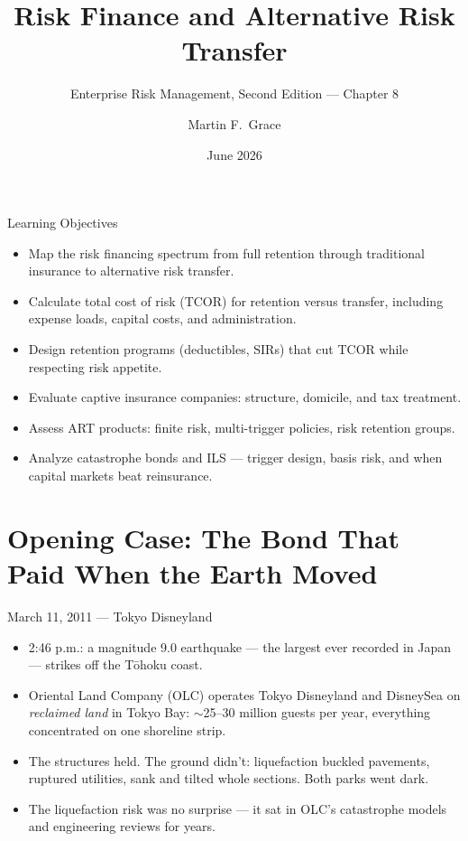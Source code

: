 \documentclass[11pt, aspectratio=169]{beamer}
\title[ERM Ch.\,8]{Risk Finance and Alternative Risk Transfer}
\subtitle{Enterprise Risk Management, Second Edition --- Chapter 8}
\author{Martin F.\ Grace}
\institute{University of Iowa\\[2pt] Tippie College of Business\\[2pt] Vaughan Institute of Risk Management}
\date{June 2026}
\begin{document}
\begin{frame}[plain]
\titlepage
\end{frame}

\begin{frame}{Learning Objectives}
\begin{itemize}
  \item Map the \alert{risk financing spectrum} from full retention through traditional insurance to alternative risk transfer.
  \item Calculate \alert{total cost of risk (TCOR)} for retention versus transfer, including expense loads, capital costs, and administration.
  \item Design retention programs (deductibles, SIRs) that cut TCOR while respecting risk appetite.
  \item Evaluate captive insurance companies: structure, domicile, and tax treatment.
  \item Assess ART products: finite risk, multi-trigger policies, risk retention groups.
  \item Analyze catastrophe bonds and ILS --- trigger design, basis risk, and when capital markets beat reinsurance.
\end{itemize}
\end{frame}

\section{Opening Case: The Bond That Paid When the Earth Moved}

\begin{frame}{March 11, 2011 --- Tokyo Disneyland}
\begin{itemize}
  \item 2:46 p.m.: a magnitude 9.0 earthquake --- the largest ever recorded in Japan --- strikes off the T\=ohoku coast.
  \item Oriental Land Company (OLC) operates Tokyo Disneyland and DisneySea on \emph{reclaimed land} in Tokyo Bay: $\sim$25--30 million guests per year, everything concentrated on one shoreline strip.
  \item The structures held. The \alert{ground} didn't: liquefaction buckled pavements, ruptured utilities, sank and tilted whole sections. Both parks went dark.
  \item The liquefaction risk was no surprise --- it sat in OLC's catastrophe models and engineering reviews for years.
\end{itemize}
\end{frame}
\end{document}
